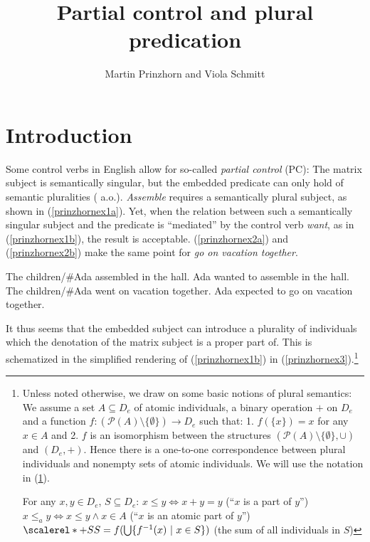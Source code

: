\documentclass[output=paper,colorlinks,citecolor=brown,
]{langscibook}
\author{Martin Prinzhorn\affiliation{University of Vienna} and Viola Schmitt\affiliation{Humboldt University Berlin}\orcid{}}
\title{Partial control and plural predication}
\begin{document}
\maketitle

\section{Introduction}\label{prinzhornsec:1}

Some control verbs in English allow for so-called  {\it partial control} (PC): The matrix subject is semantically singular, but the embedded predicate can only hold of semantic pluralities (\cite{Wilkinson:1971, Landau:2000, Wurmbrand:2001, Wurmbrand:2002, Pearson:2016} a.o.). {\it Assemble} requires a semantically plural subject, as shown in (\ref{prinzhornex1a}). Yet, when the relation between such a semantically singular subject and the predicate is “mediated” by the control verb {\it want}, as in (\ref{prinzhornex1b}), the result is acceptable. (\ref{prinzhornex2a}) and (\ref{prinzhornex2b}) make the same point for {\it go on vacation together}.

\ea  
\ea The children\slash\#Ada assembled in the hall. \label{prinzhornex1a}
\ex	Ada wanted to assemble in the hall. \hfill \citep[(1a)]{Pearson:2016} \label{prinzhornex1b}
\ex The children\slash\#Ada went on vacation together. \label{prinzhornex2a}
\ex Ada expected to go on vacation together. \hfill \citep[(1a)]{Pearson:2016} \label{prinzhornex2b}
\z\z
	
It thus seems that the embedded subject can introduce a plurality of individuals which the denotation of the matrix subject is a proper part of. This is schematized in the simplified rendering of (\ref{prinzhornex1b}) in (\ref{prinzhornex3}).\footnote{Unless noted otherwise, we draw on some basic notions of plural semantics: We assume a set $A \subseteq D_e$ of atomic individuals, a binary operation $+$ on $D_e$ and a function $f\colon (\mathcal{P}(A)\setminus \{\emptyset\}) \to D_e$ such that: 1. $f(\{x\}) = x$ for any $x \in A$ and 2. $f$ is an isomorphism between the structures $(\mathcal{P}(A)\setminus \{\emptyset\}, \cup)$ and $(D_e, +)$. Hence there is a one-to-one correspondence between plural individuals and nonempty sets of atomic individuals. We will use the notation in (\ref{prinzhornDD}).

\ea \label{prinzhornDD} For any $x, y \in D_e$, $S \subseteq D_e$:
\ea $x \leq y \Leftrightarrow x + y = y$ (``$x$ is a part of $y$'')
 \ex $x \leq_{a} y \Leftrightarrow x \leq y \land x \in A$ (``$x$ is an atomic part of $y$'')
\ex  $\scalerel*{+}{S}S = f(\bigcup\{f^{-1}(x)\ |\ x \in S\})$ (the sum of all individuals in $S$)
\z\z}
\end{document}
